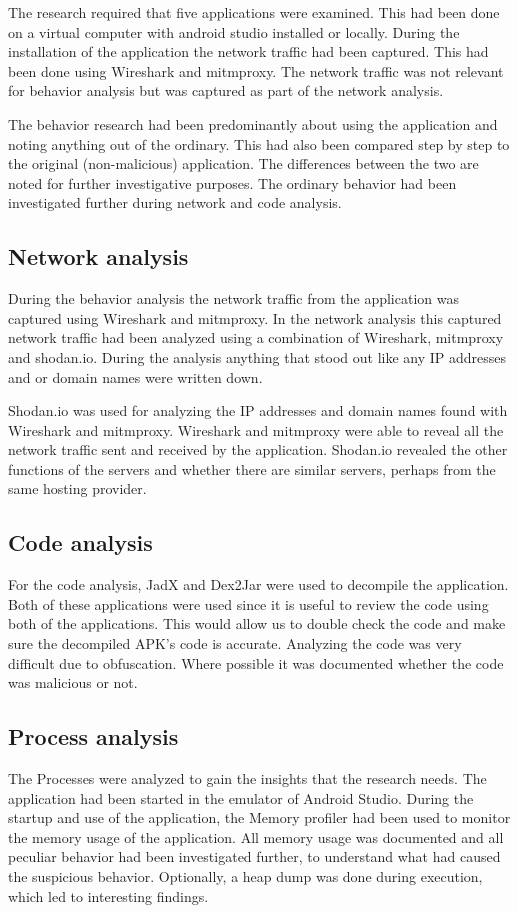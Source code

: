 The research required that five applications were examined. This had been done on a virtual computer with android studio installed or locally. During the installation of the application the network traffic had been captured. This had been done using Wireshark and mitmproxy. The network traffic was not relevant for behavior analysis but was captured as part of the network analysis.

The behavior research had been predominantly about using the application and noting anything out of the ordinary. This had also been compared step by step to the original (non-malicious) application. The differences between the two are noted for further investigative purposes. The ordinary behavior had been investigated further during network and code analysis.

\subsection{Network analysis}

During the behavior analysis the network traffic from the application was captured using Wireshark and mitmproxy. In the network analysis this captured network traffic had been analyzed using a combination of Wireshark, mitmproxy and shodan.io. During the analysis anything that stood out like any IP addresses and or domain names were written down.

Shodan.io was used for analyzing the IP addresses and domain names found with Wireshark and mitmproxy. Wireshark and mitmproxy were able to reveal all the network traffic sent and received by the application. Shodan.io revealed the other functions of the servers and whether there are similar servers, perhaps from the same hosting provider.

\subsection{Code analysis}

For the code analysis, JadX and Dex2Jar were used to decompile the application. Both of these applications were used since it is useful to review the code using both of the applications. This would allow us to double check the code and make sure the decompiled APK's code is accurate. Analyzing the code was very difficult due to obfuscation. Where possible it was documented whether the code was malicious or not.

\subsection{Process analysis}
The Processes were analyzed to gain the insights that the research needs. The application had been started in the emulator of Android Studio. During the startup and use of the application, the Memory profiler had been used to monitor the memory usage of the application. All memory usage was documented and all peculiar behavior had been investigated further, to understand what had caused the suspicious behavior. Optionally, a heap dump was done during execution, which led to interesting findings.

